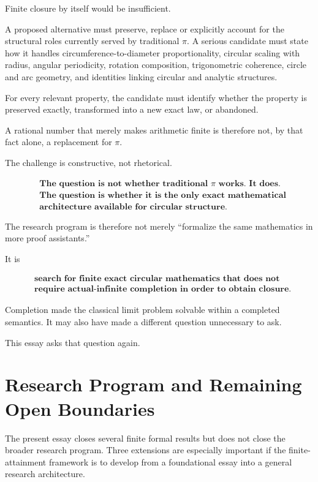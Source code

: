 \documentclass[11pt,a4paper]{article}
\begin{document}
Finite closure by itself would be insufficient.

A proposed alternative must preserve, replace or explicitly account
for the structural roles currently served by traditional \(\pi\).
A serious candidate must state how it handles circumference-to-diameter
proportionality, circular scaling with radius, angular periodicity,
rotation composition, trigonometric coherence, circle and arc
geometry, and identities linking circular and analytic structures.

For every relevant property, the candidate must identify whether the
property is preserved exactly, transformed into a new exact law, or
abandoned.

A rational number that merely makes arithmetic finite is therefore not,
by that fact alone, a replacement for \(\pi\).

The challenge is constructive, not rhetorical.

\[
\boxed{
\begin{aligned}
&\textbf{The question is not whether traditional \(\pi\) works. It does.}\\
&\textbf{The question is whether it is the only exact mathematical}\\
&\textbf{architecture available for circular structure.}
\end{aligned}
}
\]

The research program is therefore not merely ``formalize the same
mathematics in more proof assistants.''

It is

\[
\boxed{
\begin{aligned}
&\textbf{search for finite exact circular mathematics that does not}\\
&\textbf{require actual-infinite completion in order to obtain closure.}
\end{aligned}
}
\]

Completion made the classical limit problem solvable within a
completed semantics. It may also have made a different question
unnecessary to ask.

This essay asks that question again.

\section{Research Program and Remaining Open Boundaries}

The present essay closes several finite formal results but does not
close the broader research program. Three extensions are especially
important if the finite-attainment framework is to develop from a
foundational essay into a general research architecture.
\end{document}
